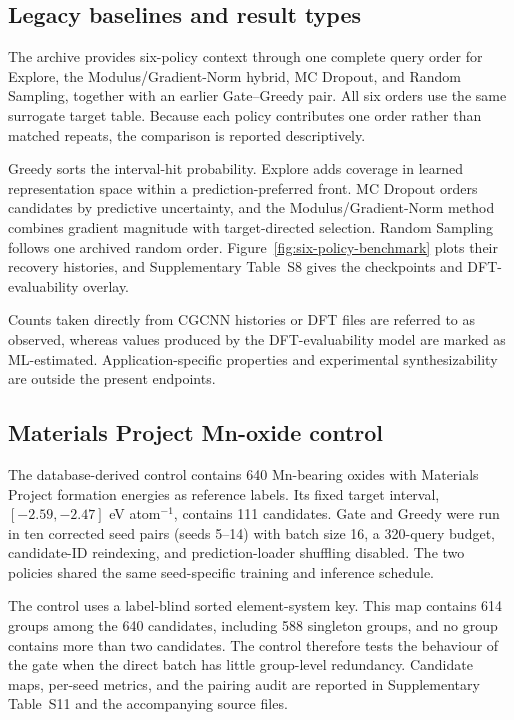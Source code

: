\subsection{Legacy baselines and result types}

The archive provides six-policy context through one complete query order for
Explore, the Modulus/Gradient-Norm hybrid, MC Dropout, and Random Sampling,
together with an earlier Gate--Greedy pair. All six orders use the same
surrogate target table. Because each policy contributes one order rather than
matched repeats, the comparison is reported descriptively.

Greedy sorts the interval-hit probability. Explore adds coverage in learned
representation space within a prediction-preferred front. MC Dropout orders
candidates by predictive uncertainty, and the Modulus/Gradient-Norm method
combines gradient magnitude with target-directed selection. Random Sampling
follows one archived random order. Figure~\ref{fig:six-policy-benchmark} plots
their recovery histories, and Supplementary Table~S8 gives the checkpoints and
DFT-evaluability overlay.

Counts taken directly from CGCNN histories or DFT files are referred to as
observed, whereas values produced by the DFT-evaluability model are marked as
ML-estimated. Application-specific properties and experimental synthesizability
are outside the present endpoints.

\subsection{Materials Project Mn-oxide control}

The database-derived control contains 640 Mn-bearing oxides with Materials
Project formation energies as reference labels. Its fixed target interval,
$[-2.59,-2.47]$ eV atom$^{-1}$, contains 111 candidates. Gate and Greedy were
run in ten corrected seed pairs (seeds 5--14) with batch size 16, a 320-query
budget, candidate-ID reindexing, and prediction-loader shuffling disabled. The
two policies shared the same seed-specific training and inference schedule.

The control uses a label-blind sorted element-system key. This map contains 614
groups among the 640 candidates, including 588 singleton groups, and no group
contains more than two candidates. The control therefore tests the behaviour of
the gate when the direct batch has little group-level redundancy. Candidate
maps, per-seed metrics, and the pairing audit are reported in Supplementary
Table~S11 and the accompanying source files.

